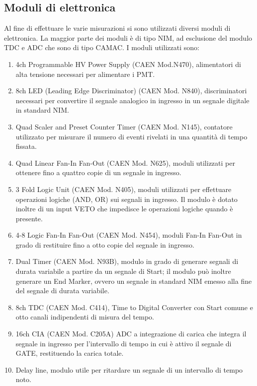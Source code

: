 \documentclass{standalone}
\begin{document}
\subsection{Moduli di elettronica}
Al fine di effettuare le varie misurazioni si sono utilizzati diversi moduli di elettronica. La maggior parte dei moduli è di tipo NIM, ad esclusione del modulo TDC e ADC che sono di tipo CAMAC.
I moduli utilizzati sono:\\
\begin{enumerate}
	\item 4ch Programmable HV Power Supply (CAEN Mod.N470), alimentatori di alta tensione necessari per alimentare i PMT.
	\item 8ch LED (Leading Edge Discriminator) (CAEN Mod. N840), discriminatori necessari per convertire il segnale analogico in ingresso in un segnale digitale in standard NIM.
	\item Quad Scaler and Preset Counter Timer (CAEN Mod. N145), contatore utilizzato per misurare il numero di eventi rivelati in una quantit\`a di tempo fissata.
	\item Quad Linear Fan-In Fan-Out (CAEN Mod. N625), moduli utilizzati per ottenere fino a quattro copie di un segnale in ingresso.
	\item 3 Fold Logic Unit (CAEN Mod. N405), moduli utilizzati per effettuare operazioni logiche (AND, OR) sui segnali in ingresso. Il modulo \`e dotato inoltre di un input VETO che impedisce le operazioni logiche quando \`e presente.
	\item 4-8 Logic Fan-In Fan-Out (CAEN Mod. N454), moduli Fan-In Fan-Out in grado di restituire fino a otto copie del segnale in ingresso.
	\item Dual Timer (CAEN Mod. N93B), modulo in grado di generare segnali di durata variabile a partire da un segnale di Start; il modulo pu\`o inoltre generare un End Marker, ovvero un segnale in standard NIM emesso alla fine del segnale di durata variabile.
	\item 8ch TDC (CAEN Mod. C414), Time to Digital Converter con Start comune e otto canali indipendenti di misura del tempo.
	\item 16ch CIA (CAEN Mod. C205A) ADC a integrazione di carica che integra il segnale in ingresso per l'intervallo di tempo in cui \`e attivo il segnale di GATE, restituendo la carica totale.
	\item Delay line, modulo utile per ritardare un segnale di un intervallo di tempo noto.
\end{enumerate}
\end{document}
